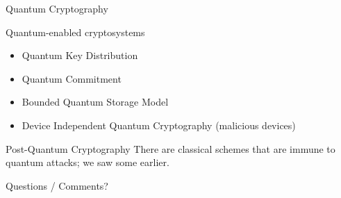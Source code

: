\documentclass[12pt]{beamer}
\begin{document}
\begin{frame}{Quantum Cryptography}
	\begin{block}{Quantum-enabled cryptosystems}
		\begin{itemize}
			\item Quantum Key Distribution
			\item Quantum Commitment
			\item Bounded Quantum Storage Model
			\item Device Independent Quantum Cryptography (malicious devices)
		\end{itemize}
	\end{block}
	\begin{block}{Post-Quantum Cryptography}
		There are classical schemes that are immune to quantum attacks; we saw
		some earlier.
	\end{block}
\end{frame}


\begin{frame}{Questions / Comments?}{}
\end{frame}
\end{document}
